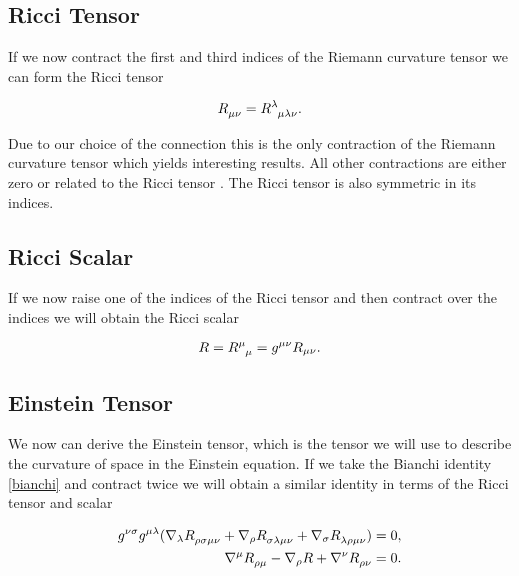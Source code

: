 \subsection{Ricci Tensor}

If we now contract the first and third indices of the Riemann curvature tensor we can form the Ricci tensor \cite{carroll}

\begin{equation} \label{ricci-tensor}
	R\indices{_\mu_\nu} = R\indices{^\lambda_\mu_\lambda_\nu} .
\end{equation}

Due to our choice of the connection this is the only contraction of the Riemann curvature tensor which yields interesting results. All other contractions are either zero or related to the Ricci tensor \cite{carroll}. The Ricci tensor is also symmetric in its indices.

\subsection{Ricci Scalar}

If we now raise one of the indices of the Ricci tensor and then contract over the indices we will obtain the Ricci scalar

\begin{equation} \label{ricci-scalar}
	R = R\indices{^\mu_\mu} = g^{\mu \nu} R_{\mu \nu} .
\end{equation}

\subsection{Einstein Tensor}

We now can derive the Einstein tensor, which is the tensor we will use to describe the curvature of space in the Einstein equation. If we take the Bianchi identity \eqref{bianchi} and contract twice we will obtain a similar identity in terms of the Ricci tensor and scalar

\begin{equation} \label{bianchi-contract}
	\begin{aligned}
		g^{\nu \sigma} g^{\mu \lambda} (\nabla_{\lambda} R\indices{_\rho_\sigma_\mu_\nu} + \nabla_{\rho} R\indices{_\sigma_\lambda_\mu_\nu} + \nabla_{\sigma} R\indices{_\lambda_\rho_\mu_\nu}) &= 0  , \\
		\nabla^{\mu} R\indices{_\rho_\mu} - \nabla_{\rho} R + \nabla^{\nu} R\indices{_\rho_\nu} &= 0 .
	\end{aligned}
\end{equation}

